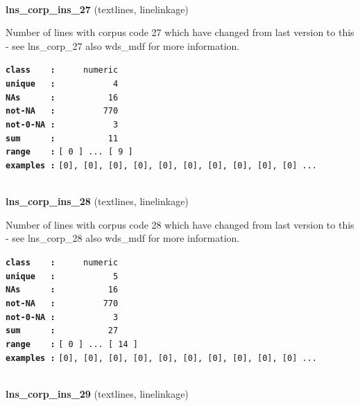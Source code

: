 \documentclass[]{article}
\begin{document}
~

\textbf{lns\_corp\_ins\_27} (textlines, linelinkage)

Number of lines with corpus code 27 which have changed from last version
to this - see lns\_corp\_27 also wds\_mdf for more information.

\textbf{\texttt{class\ \ \ \ :}} \texttt{~~~~~numeric}\\
\textbf{\texttt{unique\ \ \ :}} \texttt{~~~~~~~~~~~4}\\
\textbf{\texttt{NAs\ \ \ \ \ \ :}} \texttt{~~~~~~~~~~16}\\
\textbf{\texttt{not-NA\ \ \ :}} \texttt{~~~~~~~~~770}\\
\textbf{\texttt{not-0-NA\ :}} \texttt{~~~~~~~~~~~3}\\
\textbf{\texttt{sum\ \ \ \ \ \ :}} \texttt{~~~~~~~~~~11}\\
\textbf{\texttt{range\ \ \ \ :}}
\texttt{{[}\ 0\ {]}\ ...\ {[}\ 9\ {]}}\\
\textbf{\texttt{examples\ :}}
\texttt{{[}0{]},\ {[}0{]},\ {[}0{]},\ {[}0{]},\ {[}0{]},\ {[}0{]},\ {[}0{]},\ {[}0{]},\ {[}0{]},\ {[}0{]}\ ...}\\

~

\textbf{lns\_corp\_ins\_28} (textlines, linelinkage)

Number of lines with corpus code 28 which have changed from last version
to this - see lns\_corp\_28 also wds\_mdf for more information.

\textbf{\texttt{class\ \ \ \ :}} \texttt{~~~~~numeric}\\
\textbf{\texttt{unique\ \ \ :}} \texttt{~~~~~~~~~~~5}\\
\textbf{\texttt{NAs\ \ \ \ \ \ :}} \texttt{~~~~~~~~~~16}\\
\textbf{\texttt{not-NA\ \ \ :}} \texttt{~~~~~~~~~770}\\
\textbf{\texttt{not-0-NA\ :}} \texttt{~~~~~~~~~~~3}\\
\textbf{\texttt{sum\ \ \ \ \ \ :}} \texttt{~~~~~~~~~~27}\\
\textbf{\texttt{range\ \ \ \ :}}
\texttt{{[}\ 0\ {]}\ ...\ {[}\ 14\ {]}}\\
\textbf{\texttt{examples\ :}}
\texttt{{[}0{]},\ {[}0{]},\ {[}0{]},\ {[}0{]},\ {[}0{]},\ {[}0{]},\ {[}0{]},\ {[}0{]},\ {[}0{]},\ {[}0{]}\ ...}\\

~

\textbf{lns\_corp\_ins\_29} (textlines, linelinkage)
\end{document}
